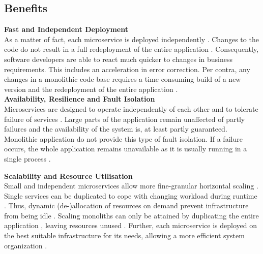 \subsection{Benefits}
\textbf{Fast and Independent Deployment} \\
As a matter of fact, each microservice is deployed independently \cite{interfaceAnalysisBaresi}. Changes to the code do not result in a full redeployment of the entire application \cite{FunctionalDecompositionHeinrich}. Consequently, software developers are able to react much quicker to changes in business requirements. This includes an acceleration in error correction. Per contra, any changes in a monolithic code base requires a time consuming build of a new version and the redeployment of the entire application \cite{Fowler}. \\

\noindent
\textbf{Availability, Resilience and Fault Isolation} \\
Microservices are designed to operate independently of each other and to tolerate failure of services \cite{Fowler}. Large parts of the application remain unaffected of partly failures and the availability of the system is, at least partly guaranteed. Monolithic application do not provide this type of fault isolation. If a failure occurs, the whole application remains unavailable as it is usually running in a single process \cite{ExtractionMazlami}. 
 
\noindent
\textbf{Scalability and Resource Utilisation} \\
Small and independent microservices allow more fine-granular horizontal scaling \cite{WorkloadbasedClustering}. Single services can be duplicated to cope with changing workload during runtime \cite{DataflowDrivenChen}. Thus, dynamic (de-)allocation of resources on demand prevent infrastructure from being idle \cite{HeuristicsAlwis}. Scaling monoliths can only be attained by duplicating the entire application , leaving resources unused \cite{ClassificationOfRefactoring}. Further, each microservice is deployed on the best suitable infrastructure for its needs, allowing a more efficient system organization \cite{infoq}. \\

